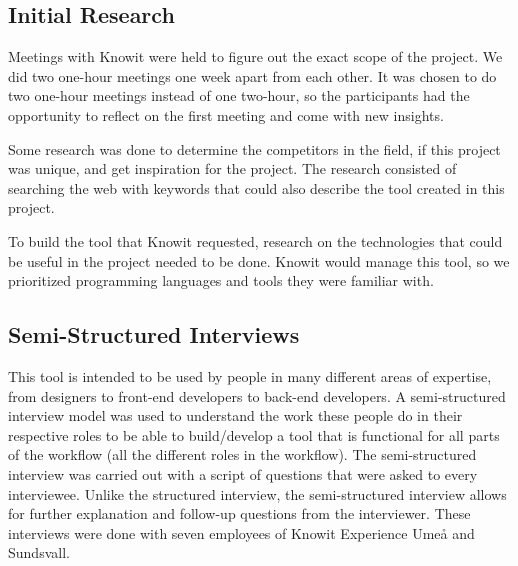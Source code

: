 \subsection{Initial Research}%
\label{sub:Initial Research}

Meetings with Knowit were held to figure out the exact scope of the project. We did two one-hour meetings one week apart from each other. It was chosen to do two one-hour meetings instead of one two-hour, so the participants had the opportunity to reflect on the first meeting and come with new insights.

Some research was done to determine the competitors in the field, if this project was unique, and get inspiration for the project. The research consisted of searching the web with keywords that could also describe the tool created in this project. 

To build the tool that Knowit requested, research on the technologies that could be useful in the project needed to be done. Knowit would manage this tool, so we prioritized programming languages and tools they were familiar with.



\subsection{Semi-Structured Interviews}%
\label{sub:inteviews}
This tool is intended to be used by people in many different areas of expertise, from designers to front-end developers to back-end developers. A semi-structured interview model was used \cite{galletta2013mastering} to understand the work these people do in their respective roles to be able to build/develop a tool that is functional for all parts of the workflow (all the different roles in the workflow). The semi-structured interview was carried out with a script of questions that were asked to every interviewee. Unlike the structured interview, the semi-structured interview allows for further explanation and follow-up questions from the interviewer. These interviews were done with seven employees of Knowit Experience Umeå and Sundsvall. 

